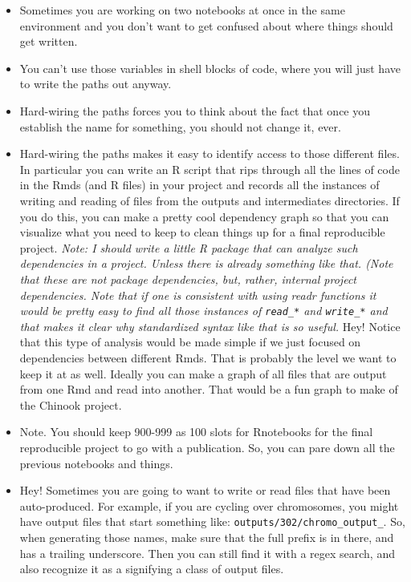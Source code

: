 \documentclass[]{krantz}
\providecommand{\tightlist}{%
  \setlength{\itemsep}{0pt}\setlength{\parskip}{0pt}}
\begin{document}
\begin{itemize}
\tightlist
\item
  Sometimes you are working on two notebooks at once in the same environment and you
  don't want to get confused about where things should get written.
\item
  You can't use those variables in shell blocks of code, where you will just have
  to write the paths out anyway.
\item
  Hard-wiring the paths forces you to think about the fact that once you establish
  the name for something, you should not change it, ever.
\item
  Hard-wiring the paths makes it easy to identify access to those different files. In particular
  you can write an R script that rips through all the lines of code in the Rmds (and R files) in your
  project and records all the instances of writing and reading of files from the outputs and intermediates
  directories. If you do this, you can make a pretty cool dependency graph so that you can visualize
  what you need to keep to clean things up for a final reproducible project. \emph{Note: I should
  write a little R package that can analyze such dependencies in a project. Unless there is
  already something like that. (Note that these are not package dependencies, but, rather, internal
  project dependencies. Note that if one is consistent with using readr functions it would be
  pretty easy to find all those instances of \texttt{read\_*} and \texttt{write\_*} and that makes it clear
  why standardized syntax like that is so useful.} Hey! Notice that this type of analysis
  would be made simple if we just focused on dependencies between different Rmds. That is
  probably the level we want to keep it at as well. Ideally you can make a graph of all files
  that are output from one Rmd and read into another. That would be a fun graph to make of the
  Chinook project.
\item
  Note. You should keep 900-999 as 100 slots for Rnotebooks for the final reproducible project
  to go with a publication. So, you can pare down all the previous notebooks and things.
\item
  Hey! Sometimes you are going to want to write or read files that have been auto-produced.
  For example, if you are cycling over chromosomes, you might have output files that start
  something like: \texttt{outputs/302/chromo\_output\_}. So, when generating those names,
  make sure that the full prefix is in there, and has a trailing underscore. Then
  you can still find it with a regex search, and also recognize it as a
  signifying a class of output files.
\end{itemize}
\end{document}
